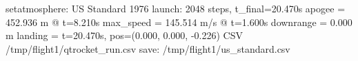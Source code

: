 \begin{console}
\ok setatmosphere: US Standard 1976
\ok launch: 2048 steps, t_final=20.470s
  apogee    = 452.936 m @ t=8.210s
  max_speed = 145.514 m/s @ t=1.600s
  downrange = 0.000 m
  landing   = t=20.470s, pos=(0.000, 0.000, -0.226)
CSV /tmp/flight1/qtrocket_run.csv
\ok save: /tmp/flight1/us_standard.csv
\end{console}
